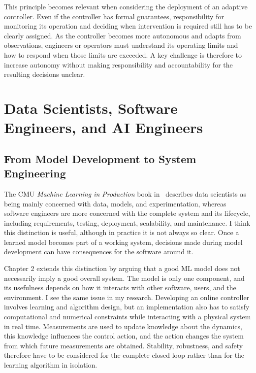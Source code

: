 \documentclass[11pt,a4paper]{article}
\begin{document}
This principle becomes relevant when considering the deployment of an adaptive controller. Even if the controller has formal guarantees, responsibility for monitoring its operation and deciding when intervention is required still has to be clearly assigned. As the controller becomes more autonomous and adapts from observations, engineers or operators must understand its operating limits and how to respond when those limits are exceeded. A key challenge is therefore to increase autonomy without making responsibility and accountability for the resulting decisions unclear.

\section{Data Scientists, Software Engineers, and AI Engineers}
\label{sec:roles}

\subsection{From Model Development to System Engineering}

The CMU \emph{Machine Learning in Production} book in~\cite{kastner2025machine} describes data scientists as being mainly concerned with data, models, and experimentation, whereas software engineers are more concerned with the complete system and its lifecycle, including requirements, testing, deployment, scalability, and maintenance. I think this distinction is useful, although in practice it is not always so clear. Once a learned model becomes part of a working system, decisions made during model development can have consequences for the software around it.

Chapter 2 extends this distinction by arguing that a good ML model does not necessarily imply a good overall system. The model is only one component, and its usefulness depends on how it interacts with other software, users, and the environment. I see the same issue in my research. Developing an online controller involves learning and algorithm design, but an implementation also has to satisfy computational and numerical constraints while interacting with a physical system in real time. Measurements are used to update knowledge about the dynamics, this knowledge influences the control action, and the action changes the system from which future measurements are obtained. Stability, robustness, and safety therefore have to be considered for the complete closed loop rather than for the learning algorithm in isolation.
\end{document}
